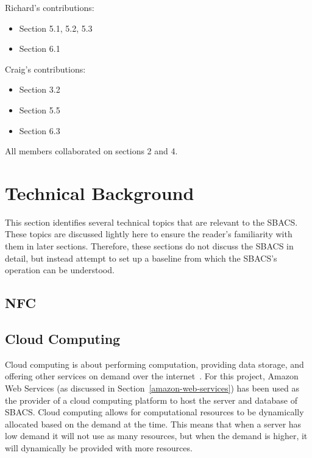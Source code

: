 \documentclass[12pt]{report}
\let\Oldsection\section
\renewcommand{\section}{\FloatBarrier\Oldsection}
\begin{document}
Richard's contributions:
\begin{itemize}
\item Section 5.1, 5.2, 5.3
\item Section 6.1
\end{itemize}

Craig's contributions:
\begin{itemize}
\item Section 3.2
\item Section 5.5
\item Section 6.3
\end{itemize}

All members collaborated on sections 2 and 4.


\chapter{Technical Background} \label{technical-background}

This section identifies several technical topics that are relevant to the SBACS. These topics are discussed lightly here
to ensure the reader's familiarity with them in later sections. Therefore, these sections do not discuss the SBACS in
detail, but instead attempt to set up a baseline from which the SBACS's operation can be understood.


\section{NFC} \label{nfc}


\section{Cloud Computing} \label{cloud-computing}

Cloud computing is about performing computation, providing data storage, and offering other services
on demand over the internet~\autocite{CLOUDCOMPUTING}. For this project, Amazon Web Services (as discussed
in Section~\ref{amazon-web-services})
has been used as the provider of a cloud computing platform to host the server and database of SBACS.
Cloud computing allows for computational resources to be dynamically allocated based on the demand
at the time. This means that when a server has low demand it will not use as many resources, but when
the demand is higher, it will dynamically be provided with more resources.
\end{document}
